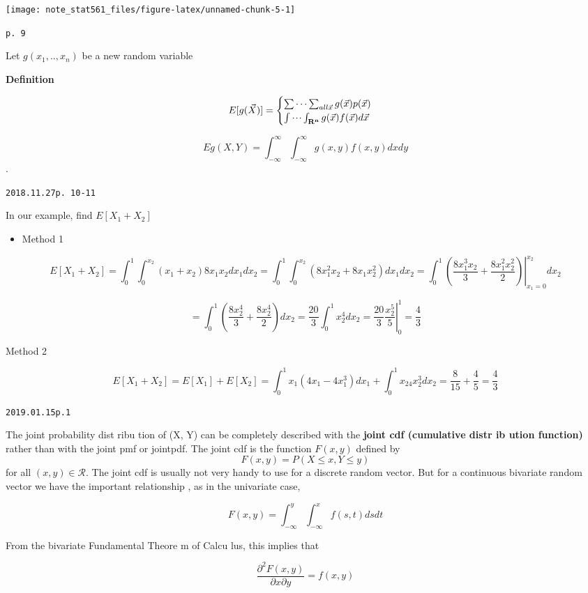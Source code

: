 \documentclass[]{tufte-book}
\providecommand{\tightlist}{%
  \setlength{\itemsep}{0pt}\setlength{\parskip}{0pt}}
\begin{document}
\texttt{[image: note\_stat561\_files/figure-latex/unnamed-chunk-5-1]}

\texttt{p.\ 9}

Let \(g(x_1,..,x_n)\) be a new random variable

\textbf{Definition}

\[E[g(\vec X)]=\begin{cases}\sum\cdots\sum_{all\vec x} g(\vec x)p(\vec x) \\ \idotsint_{\mathbf{R^n}}g(\vec x)f(\vec x)d\vec x\end{cases}\]

\[Eg(X,Y)=\int_{-\infty}^{\infty}\int_{-\infty}^{\infty} g(x, y)f(x, y) dx dy\].

\texttt{2018.11.27\textasciigrave{}\textasciigrave{}p.\ 10-11}

In our example, find \(E[X_1+X_2]\)

\begin{itemize}
\tightlist
\item
  Method 1
\end{itemize}

\[E[X_1+X_2]=\int_0^1\int_0^{x_2}(x_1+x_2)8x_1x_2dx_1dx_2=\int_0^1\int_0^{x_2}(8x_1^2x_2+8x_1x_2^2)dx_1dx_2=\int_0^1\left.(\frac{8x_1^3x_2}3+\frac{8x_1^2x_2^2}2)\right|_{x_1=0}^{x_2}dx_2\]

\[=\int_0^1(\frac{8x_2^4}3+\frac{8x_2^4}2)dx_2=\frac{20}3\int_0^1x_2^4dx_2=\frac{20}3\left.\frac{x_2^5}5\right|_0^1=\frac43\]

Method 2

\[E[X_1+X_2]=E[X_1]+E[X_2]=\int_0^1x_1(4x_1-4x_1^3)dx_1+\int_0^1x_24x_2^3dx_2=\frac8{15}+\frac45=\frac43\]

\texttt{2019.01.15\textasciigrave{}\textasciigrave{}p.1}

The joint probability dist ribu tion of (X, Y) can be completely
described with the \textbf{joint cdf (cumulative distr ib ution
function)} rather than with the joint pmf or jointpdf. The joint cdf is
the function \(F(x, y)\) defined by \[F(x,y) = P(X\le x, Y\le y)\] for
all \((x,y)\in\mathcal{R}\). The joint cdf is usually not very handy to
use for a discrete random vector. But for a continuous bivariate random
vector we have the important relationship , as in the univariate case,

\[F(x,y) =\int_{-\infty}^{y}\int_{-\infty}^{x}f(s,t)dsdt\]

From the bivariate Fundamental Theore m of Calcu lus, this implies that

\[\frac{\partial^2F(x,y)}{\partial x\partial y}=f(x,y)\]
\end{document}

